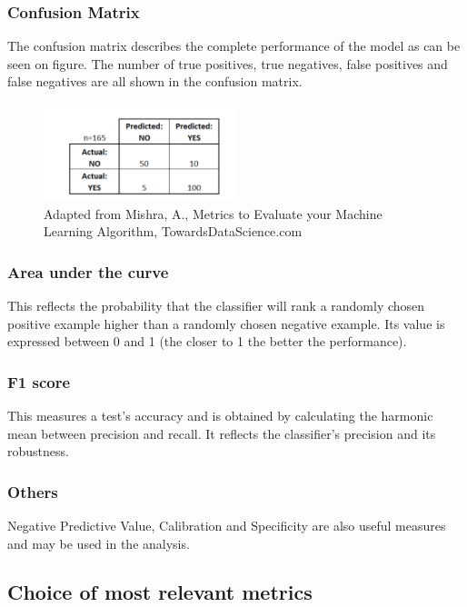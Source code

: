 \subsubsection{Confusion Matrix}

The confusion matrix describes the complete performance of the model as can be seen on figure. The number of true positives, true negatives, false positives and false negatives are all shown in the confusion matrix.

\begin{figure}[H]
    \centering
    \includegraphics[width=0.5\textwidth]{ThesisTemplate/usingLatex/images/ConfusionMatrix.png}
    \caption{Adapted from Mishra, A., Metrics to Evaluate your Machine Learning Algorithm, TowardsDataScience.com}
    \label{fig:my_label}
\end{figure}

\subsubsection{Area under the curve}
This reflects the probability that the classifier will rank a randomly chosen positive example higher than a randomly chosen negative example. Its value is expressed between 0 and 1 (the closer to 1 the better the performance).


\subsubsection{F1 score}
This measures a test's accuracy and is obtained by calculating the harmonic mean between precision and recall. It reflects the classifier's precision and its robustness.

\subsubsection{Others}
Negative Predictive Value, Calibration and Specificity are also useful measures and may be used in the analysis.

\subsection{Choice of most relevant metrics}
